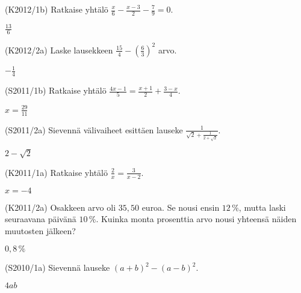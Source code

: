 \begin{tehtava}(K2012/1b)  Ratkaise yhtälö $\frac{x}{6} - \frac{x-3}{2} - \frac{7}{9} = 0$. 
                        \begin{vastaus}
				$\frac{13}{6}$
			\end{vastaus}
\end{tehtava}

\begin{tehtava}(K2012/2a) Laske lausekkeen $ \frac{15}{4} - \left( \frac{6}{3} \right)^2 $ arvo.
\begin{vastaus}
				$-\frac{1}{4}$
				\end{vastaus}
\end{tehtava}

\begin{tehtava}(S2011/1b) Ratkaise yhtälö $\frac{4x - 1}{5} = \frac{x + 1}{2} + \frac{3 - x}{4}$.
                        \begin{vastaus}
				$x=\frac{29}{11}$
				\end{vastaus}
\end{tehtava}

\begin{tehtava}(S2011/2a) Sievennä välivaiheet esittäen lauseke $\frac{1}{\sqrt{2} + \frac{1}{2 + \sqrt{2}}}$.
                     \begin{vastaus}
				$2-\sqrt{2}$
				\end{vastaus}
\end{tehtava}


\begin{tehtava}(K2011/1a) Ratkaise yhtälö $\frac{2}{x} = \frac{3}{x - 2}$.
\begin{vastaus}
				$x=-4$
				\end{vastaus}
\end{tehtava}

\begin{tehtava}(K2011/2a) Osakkeen arvo oli $35,50$ euroa. Se nousi ensin $12\,\%$, mutta laski seuraavana päivänä $10\,\%$. Kuinka monta prosenttia arvo nousi yhteensä näiden muutosten jälkeen?
  \begin{vastaus} $0,8\,\%$
  \end{vastaus}
\end{tehtava}


\begin{tehtava}(S2010/1a) Sievennä lauseke $(a + b)^2 - (a - b)^2$.
\begin{vastaus}
				$4ab$
				\end{vastaus}
\end{tehtava}

